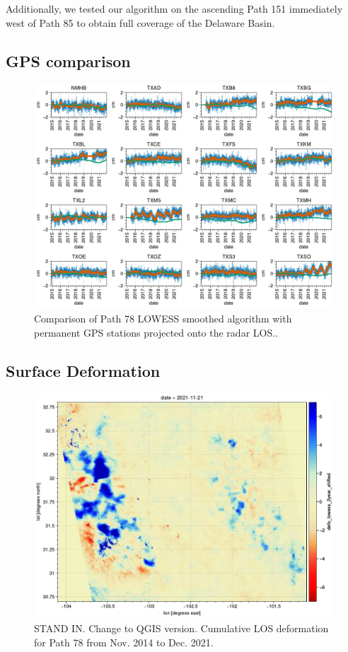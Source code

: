 Additionally, we tested our algorithm on the ascending Path 151 immediately west of Path 85 to obtain full coverage of the Delaware Basin.

\subsection{GPS comparison}


\begin{figure}
	\centering
	\includegraphics[width=.99\textwidth]{figures/chapter5-lowess/gps_path78.pdf}
	\caption[GPS comparison for Path 78 LOWESS smoothing]{
		Comparison of Path 78 LOWESS smoothed algorithm with permanent GPS stations projected onto the radar LOS..
	}
	\label{fig:ch5-results-gpsi}
\end{figure}

\subsection{Surface Deformation}

\begin{figure}
	\centering
	\includegraphics[width=.99\textwidth]{figures/chapter5-lowess/deformation_path78.pdf}
	\caption[GPS comparison for Path 78 LOWESS smoothing]{
STAND IN. Change to QGIS version.
Cumulative LOS deformation for Path 78 from Nov. 2014 to Dec. 2021.
	}
	\label{fig:ch5-results-path78}
\end{figure}

